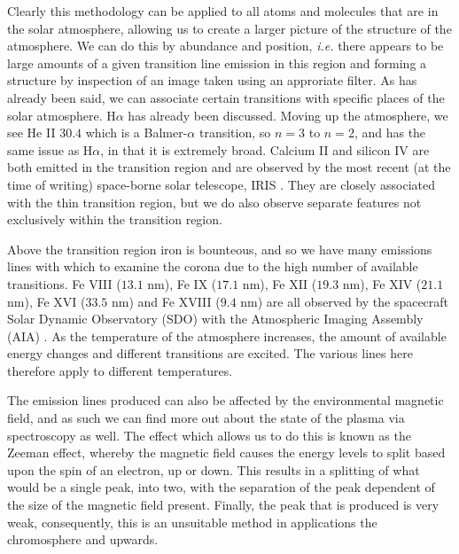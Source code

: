 Clearly this methodology can be applied to all atoms and molecules that are in the solar atmosphere, allowing us to create a larger picture of the structure of the atmosphere.
We can do this by abundance and position, \emph{i.e.} there appears to be large amounts of a given transition line emission in this region and forming a structure by inspection of an image taken using an approriate filter.
As has already been said, we can associate certain transitions with specific places of the solar atmosphere.
H$\alpha$ has already been discussed.
Moving up the atmosphere, we see He II $30.4$ \cite{Bazin2010} which is a Balmer-$\alpha$ transition, so $n=3$ to $n=2$, and has the same issue as H$\alpha$, in that it is extremely broad.
Calcium II and silicon IV are both emitted in the transition region and are observed by the most recent (at the time of writing) space-borne solar telescope, IRIS \cite{PereiraIRIS2014}.
They are closely associated with the thin transition region, but we do also observe separate features not exclusively within the transition region.

Above the transition region iron is bounteous, and so we have many emissions lines with which to examine the corona due to the high number of available transitions.
Fe VIII ($13.1$ nm), Fe IX ($17.1$ nm), Fe XII ($19.3$ nm), Fe XIV ($21.1$ nm), Fe XVI ($33.5$ nm) and Fe XVIII ($9.4$ nm) are all observed by the spacecraft Solar Dynamic Observatory (SDO) with the Atmospheric Imaging Assembly (AIA) \cite{Schmelz2013}.
As the temperature of the atmosphere increases, the amount of available energy changes and different transitions are excited.
The various lines here therefore apply to different temperatures.



The emission lines produced can also be affected by the environmental magnetic field, and as such we can find more out about the state of the plasma via spectroscopy as well. %
The effect which allows us to do this is known as the Zeeman effect, whereby the magnetic field causes the energy levels to split based upon the spin of an electron, up or down.
This results in a splitting of what would be a single peak, into two, with the separation of the peak dependent of the size of the magnetic field present.
Finally, the peak that is produced is very weak, consequently, this is an unsuitable method in applications the chromosphere and upwards.


